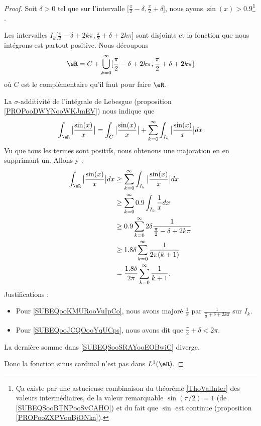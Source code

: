 \begin{proof}
    Soit \( \delta>0\) tel que sur l'intervalle \( \mathopen[ \frac{ \pi }{2}-\delta , \frac{ \pi }{ 2 }+\delta \mathclose]\), nous ayons \( \sin(x)>0.9\)\footnote{Ça existe par une astucieuse combinaison du théorème \ref{ThoValInter} des valeurs intermédiaires, de la valeur remarquable \( \sin(\pi/2)=1\) (de \eqref{SUBEQSooBTNPooSvCAHO}) et du fait que \( \sin\) est continue (proposition \ref{PROPooZXPVooBjONka}).} .

    Les intervalles \( I_k\mathopen[ \frac{ \pi }{2}-\delta+2k\pi , \frac{ \pi }{2}+\delta+2k\pi \mathclose]\) sont disjoints et la fonction que nous intégrons est partout positive. Nous découpons
    \begin{equation}
        \eR=C+\bigcup_{k=0}^{\infty}\mathopen[ \frac{ \pi }{2}-\delta+2k\pi , \frac{ \pi }{2}+\delta+2k\pi \mathclose]
    \end{equation}
    où \( C\) est le complémentaire qu'il faut pour faire \( \eR\).

    La \( \sigma\)-additivité de l'intégrale de Lebesgue (proposition \ref{PROPooDWYNooWKJmEV}) nous indique que
    \begin{equation}
        \int_{\eR}\big| \frac{ \sin(x) }{ x } \big|= \int_C\big| \frac{ \sin(x) }{ x } \big|+  \sum_{k=0}^{\infty}\int_{I_k}\big| \frac{ \sin(x) }{ x } \big|dx
    \end{equation}
    Vu que tous les termes sont positifs, nous obtenons une majoration en en supprimant un. Allons-y :
    \begin{subequations}        \label{SUBEQSooSRAYooEOBwiC}
        \begin{align}
            \int_{\eR}\big| \frac{ \sin(x) }{ x } \big|dx&\geq \sum_{k=0}^{\infty}\int_{I_k}\big| \frac{ \sin(x) }{ x } \big|dx\\
            &\geq\sum_{k=0}^{\infty}0.9\int_{I_k}\frac{ 1 }{ x }dx\\
            &\geq 0.9\sum_{k=0}^{\infty}2\delta\frac{1}{ \frac{ \pi }{2}-\delta+2k\pi }     \label{SUBEQooKMURooVuIpCo}\\
            &\geq 1.8\delta\sum_{k=0}^{\infty}\frac{1}{ 2\pi(k+1) }     \label{SUBEQooJCQOooYqUCps}\\
            &=\frac{ 1.8\delta }{ 2\pi }\sum_{k=0}^{\infty}\frac{1}{ k+1 }.
        \end{align}
    \end{subequations}
    Justifications :
    \begin{itemize}
        \item Pour \eqref{SUBEQooKMURooVuIpCo}, nous avons majoré \( \frac{1}{ x }\) par \( \frac{1}{ \frac{ \pi }{ 2 }+\delta+2k\pi }\) sur \( I_k\).
        \item Pour \eqref{SUBEQooJCQOooYqUCps}, nous avons dit que \( \frac{ \pi }{2}+\delta<2\pi\).
    \end{itemize}
    La dernière somme dans \eqref{SUBEQSooSRAYooEOBwiC} diverge.

    Donc la fonction sinus cardinal n'est pas dans \( L^1(\eR)\).
\end{proof}


